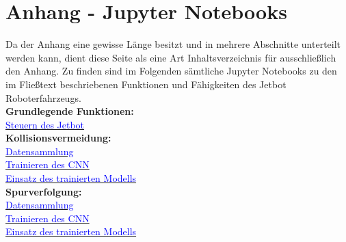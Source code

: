 \section{Anhang - Jupyter Notebooks} \label{sec:anhang}

Da der Anhang eine gewisse Länge besitzt und in mehrere Abschnitte unterteilt werden kann, dient diese Seite als eine Art Inhaltsverzeichnis für ausschließlich den Anhang. Zu finden sind im Folgenden sämtliche Jupyter Notebooks zu den im Fließtext beschriebenen Funktionen und Fähigkeiten des Jetbot Roboterfahrzeugs.\\

\textbf{Grundlegende Funktionen:}\\
\hyperlink{page.27}{\textcolor{blue}{Steuern des Jetbot}}\\

\textbf{Kollisionsvermeidung:}\\
\hyperlink{page.32}{\textcolor{blue}{Datensammlung}}\\
\hyperlink{page.36}{\textcolor{blue}{Trainieren des CNN}}\\
\hyperlink{page.39}{\textcolor{blue}{Einsatz des trainierten Modells}}\\

\textbf{Spurverfolgung:}\\
\hyperlink{page.43}{\textcolor{blue}{Datensammlung}}\\
\hyperlink{page.47}{\textcolor{blue}{Trainieren des CNN}}\\
\hyperlink{page.51}{\textcolor{blue}{Einsatz des trainierten Modells}}\\















